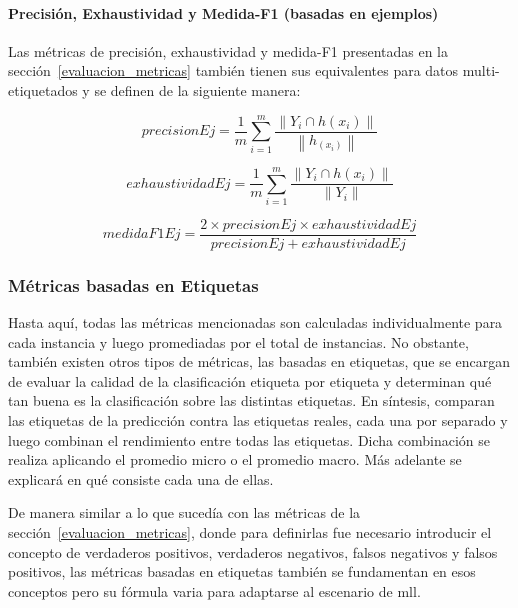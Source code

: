 \paragraph{Precisión, Exhaustividad y Medida-F1 (basadas en ejemplos)}

Las métricas de precisión, exhaustividad y medida-F1 presentadas en la
sección~\ref{evaluacion_metricas} también tienen sus equivalentes para datos
multi-etiquetados y se definen de la siguiente manera:

\begin{equation}
	precisionEj = \frac{1}{m} \sum_{i=1}^{m}
	\frac{\left\|Y_{i} \cap h(x_{i})\right\|}
	{\left\|h_(x_{i})\right\|}
\end{equation}

\begin{equation}
	exhaustividadEj = \frac{1}{m} \sum_{i=1}^{m}
	\frac{\left\|Y_{i} \cap h(x_{i})\right\|}
	{\left\|Y_{i}\right\|}
\end{equation}

\begin{equation}
	medidaF1Ej = \frac{2 \times precisionEj \times exhaustividadEj}
	{precisionEj + exhaustividadEj }
\end{equation}


\subsubsection{Métricas basadas en Etiquetas}

Hasta aquí, todas las métricas mencionadas son calculadas individualmente para
cada instancia y luego promediadas por el total de instancias. No obstante,
también existen otros tipos de métricas, las basadas en etiquetas, que se
encargan de evaluar la calidad de la clasificación etiqueta por etiqueta y
determinan qué tan buena es la clasificación sobre las distintas etiquetas.  En
síntesis, comparan las etiquetas de la predicción contra las etiquetas reales,
cada una por separado y luego combinan el rendimiento entre todas las etiquetas.
Dicha combinación se realiza aplicando el promedio micro o el promedio macro.
Más adelante se explicará en qué consiste cada una de ellas.

De manera similar a lo que sucedía con las métricas de la
sección~\ref{evaluacion_metricas}, donde para definirlas fue necesario
introducir el concepto de verdaderos positivos, verdaderos negativos, falsos
negativos y falsos positivos, las métricas basadas en etiquetas también se
fundamentan en esos conceptos pero su fórmula varia para adaptarse al escenario
de \acrshort{mll}.

